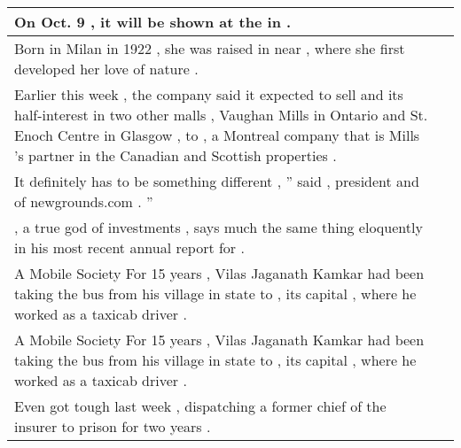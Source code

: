 \begin{table}
\begin{tabular}{p{} P{1,3cm} }
\hline
{} {On Oct. 9 , it will be shown at the \underline{} in \underline{} .} &    \\ 
\hline
{} {Born in Milan in 1922 , she was raised in \underline{} near \underline{} , where she first developed her love of nature .} &    \\ 
\hline
{} {Earlier this week , the company said it expected to sell \underline{} and its half-interest in two other malls , Vaughan Mills in Ontario and St. Enoch Centre in Glasgow , to \underline{} , a Montreal company that is Mills 's partner in the Canadian and Scottish properties .} &    \\ 
\hline
{} {It definitely has to be something different , '' said \underline{} , president and \underline{} of newgrounds.com . ''} &    \\ 
\hline
{} {\underline{} , a true god of investments , says much the same thing eloquently in his most recent annual report for \underline{} .} &    \\ 
\hline
{} {A Mobile Society For 15 years , Vilas Jaganath Kamkar had been taking the bus from his village in \underline{} state to \underline{} , its capital , where he worked as a taxicab driver .} &    \\ 
\hline
{} {A Mobile Society For 15 years , Vilas Jaganath Kamkar had been taking the bus from his village in \underline{} state to \underline{} , its capital , where he worked as a taxicab driver .} &    \\ 
\hline
{} {Even \underline{} got tough last week , dispatching a former chief of the insurer \underline{} to prison for two years .} &    \\ 

\end{tabular}
\end{table}
